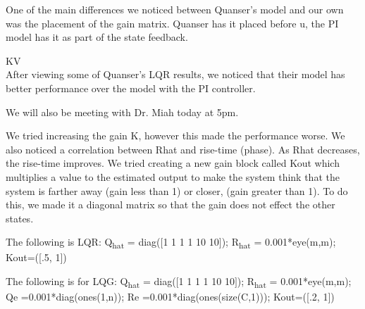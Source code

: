 \documentclass[fontsize=11pt, %
                             paper=letter, %
                             openany, %
                             captions=tableheading,
                             index=totoc,
                             hyperref]{labbook}
\begin{document}
\begin{addmargin}[0cm]{0cm}
One of the main differences we noticed between Quanser's model and our own was the placement of the gain matrix.  Quanser has it placed before u, the PI model has it as part of the state feedback.

KV\\
After viewing some of Quanser's LQR results, we noticed that their model has better performance over the model with the PI controller.\newline

We will also be meeting with Dr. Miah today at 5pm.

We tried increasing the gain K, however this made the performance worse.  We also noticed a correlation between Rhat and rise-time (phase). As Rhat decreases, the rise-time improves.  We tried creating a new gain block called Kout which multiplies a value to the estimated output to make the system think that the system is farther away (gain less than 1) or closer, (gain greater than 1).  To do this, we made it a diagonal matrix so that the gain does not effect the other states. 

The following is LQR:\newline
Q\textsubscript{hat} = diag($[$1 1 1 1 10 10$]$);\newline
R\textsubscript{hat} = 0.001*eye(m,m);\newline
Kout=([.5, 1])\newline
\newline

The following is for LQG:\newline
Q\textsubscript{hat} = diag($[$1 1 1 1 10 10$]$);\newline
R\textsubscript{hat} = 0.001*eye(m,m);\newline
Qe =0.001*diag(ones(1,n));\newline
Re =0.001*diag(ones(size(C,1)));\newline
Kout=([.2, 1])\newline
\newpage


\end{addmargin}
\end{document}
